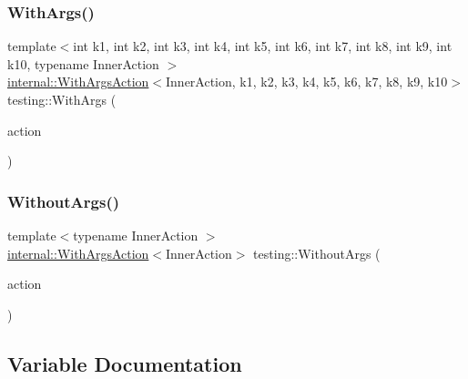 \mbox{\label{namespacetesting_a768a620ad07c6b5822201fa4f15fb4f0}} 
\subsubsection{\texorpdfstring{WithArgs()}{WithArgs()}\hspace{0.1cm}{\footnotesize\ttfamily [10/10]}}
{\footnotesize\ttfamily template$<$int k1, int k2, int k3, int k4, int k5, int k6, int k7, int k8, int k9, int k10, typename Inner\+Action $>$ \\
\mbox{\hyperlink{classtesting_1_1internal_1_1WithArgsAction}{internal\+::\+With\+Args\+Action}}$<$Inner\+Action, k1, k2, k3, k4, k5, k6, k7, k8, k9, k10$>$ testing\+::\+With\+Args (\begin{DoxyParamCaption}\item[{const Inner\+Action \&}]{action }\end{DoxyParamCaption})\hspace{0.3cm}{\ttfamily [inline]}}

\mbox{\label{namespacetesting_aeac85f74bd11112f69142e92e3a50780}} 
\subsubsection{\texorpdfstring{WithoutArgs()}{WithoutArgs()}}
{\footnotesize\ttfamily template$<$typename Inner\+Action $>$ \\
\mbox{\hyperlink{classtesting_1_1internal_1_1WithArgsAction}{internal\+::\+With\+Args\+Action}}$<$Inner\+Action$>$ testing\+::\+Without\+Args (\begin{DoxyParamCaption}\item[{const Inner\+Action \&}]{action }\end{DoxyParamCaption})\hspace{0.3cm}{\ttfamily [inline]}}



\subsection{Variable Documentation}
\mbox{\label{namespacetesting_aa09221196f0a830d5bf1c63ffce69dc3}} 
